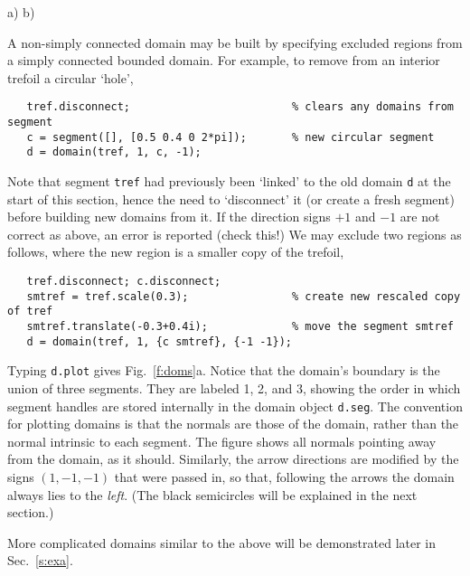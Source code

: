 \bfi %
a)
b)
\efi

A non-simply connected domain may be built by specifying excluded
regions from a simply connected bounded domain. For example,
to remove from an interior trefoil a circular `hole',
\begin{verbatim}
   tref.disconnect;                         % clears any domains from segment
   c = segment([], [0.5 0.4 0 2*pi]);       % new circular segment
   d = domain(tref, 1, c, -1);
\end{verbatim}
Note that segment {\tt tref} had previously
been `linked' to the old domain {\tt d}
at the start of this section, hence the need to `disconnect' it
(or create a fresh segment) before
building new domains from it. 
If the direction signs $+1$ and $-1$ are not correct as above, an
error is reported (check this!)
We may exclude two regions as follows, where the new region is a smaller copy
of the trefoil,
\begin{verbatim}
   tref.disconnect; c.disconnect;
   smtref = tref.scale(0.3);                % create new rescaled copy of tref
   smtref.translate(-0.3+0.4i);             % move the segment smtref
   d = domain(tref, 1, {c smtref}, {-1 -1});
\end{verbatim}
Typing {\tt d.plot} gives Fig.~\ref{f:doms}a. Notice that
the domain's boundary is the union of three segments. They are labeled
1, 2, and 3, showing the order in which segment handles
are stored internally in the domain object {\tt d.seg}.
The convention for plotting domains is that the normals
are those of the domain, rather than the normal intrinsic to each segment.
The figure shows all normals pointing away from the domain, as it should.
Similarly, the arrow directions are modified by the signs $(1,-1,-1)$ that
were passed in, so that, following the arrows the domain always lies to
the {\em left}. (The black semicircles will be explained in the next section.)

More complicated domains similar to the above will be demonstrated later in
Sec.~\ref{s:exa}.

\vspace{10ex}


